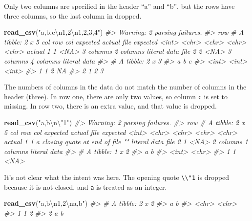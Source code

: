 \documentclass[]{book}
\newenvironment{Shaded}{\begin{snugshade}}{\end{snugshade}}
\newcommand{\CharTok}[1]{\textcolor[rgb]{0.31,0.60,0.02}{#1}}
\newcommand{\CommentTok}[1]{\textcolor[rgb]{0.56,0.35,0.01}{\textit{#1}}}
\newcommand{\KeywordTok}[1]{\textcolor[rgb]{0.13,0.29,0.53}{\textbf{#1}}}
\newcommand{\NormalTok}[1]{#1}
\newcommand{\StringTok}[1]{\textcolor[rgb]{0.31,0.60,0.02}{#1}}
\theoremstyle{definition}
\theoremstyle{definition}
\theoremstyle{definition}
\theoremstyle{remark}
\begin{document}
Only two columns are specified in the header ``a'' and ``b'', but the
rows have three columns, so the last column in dropped.

\begin{Shaded}
\begin{Highlighting}[]
\KeywordTok{read_csv}\NormalTok{(}\StringTok{"a,b,c}\CharTok{\textbackslash{}n}\StringTok{1,2}\CharTok{\textbackslash{}n}\StringTok{1,2,3,4"}\NormalTok{)}
\CommentTok{#> Warning: 2 parsing failures.}
\CommentTok{#> row # A tibble: 2 x 5 col     row col   expected  actual    file         expected   <int> <chr> <chr>     <chr>     <chr>        actual 1     1 <NA>  3 columns 2 columns literal data file 2     2 <NA>  3 columns 4 columns literal data}
\CommentTok{#> # A tibble: 2 x 3}
\CommentTok{#>       a     b     c}
\CommentTok{#>   <int> <int> <int>}
\CommentTok{#> 1     1     2    NA}
\CommentTok{#> 2     1     2     3}
\end{Highlighting}
\end{Shaded}

The numbers of columns in the data do not match the number of columns in
the header (three). In row one, there are only two values, so column
\texttt{c} is set to missing. In row two, there is an extra value, and
that value is dropped.

\begin{Shaded}
\begin{Highlighting}[]
\KeywordTok{read_csv}\NormalTok{(}\StringTok{"a,b}\CharTok{\textbackslash{}n\textbackslash{}"}\StringTok{1"}\NormalTok{)}
\CommentTok{#> Warning: 2 parsing failures.}
\CommentTok{#> row # A tibble: 2 x 5 col     row col   expected                     actual    file         expected   <int> <chr> <chr>                        <chr>     <chr>        actual 1     1 a     closing quote at end of file ""        literal data file 2     1 <NA>  2 columns                    1 columns literal data}
\CommentTok{#> # A tibble: 1 x 2}
\CommentTok{#>       a b    }
\CommentTok{#>   <int> <chr>}
\CommentTok{#> 1     1 <NA>}
\end{Highlighting}
\end{Shaded}

It's not clear what the intent was here. The opening quote
\texttt{\textbackslash{}\textbackslash{}"1} is dropped because it is not
closed, and \texttt{a} is treated as an integer.

\begin{Shaded}
\begin{Highlighting}[]
\KeywordTok{read_csv}\NormalTok{(}\StringTok{"a,b}\CharTok{\textbackslash{}n}\StringTok{1,2}\CharTok{\textbackslash{}n}\StringTok{a,b"}\NormalTok{)}
\CommentTok{#> # A tibble: 2 x 2}
\CommentTok{#>   a     b    }
\CommentTok{#>   <chr> <chr>}
\CommentTok{#> 1 1     2    }
\CommentTok{#> 2 a     b}
\end{Highlighting}
\end{Shaded}
\end{document}
